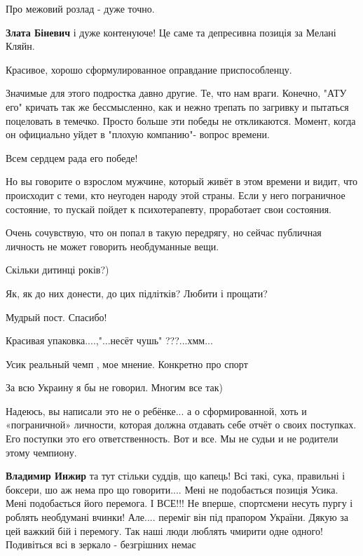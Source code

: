 \begin{itemize}
\begin{itemize}
\end{itemize} %

Про межовий розлад - дуже точно.

\begin{itemize} %
\textbf{Злата Біневич} і дуже контенуюче! Це саме та депресивна позиція за Мелані Кляйн.
\end{itemize} %

Красивое, хорошо сформулированное оправдание приспособленцу.


Значимые для этого подростка давно другие. Те, что нам враги. Конечно, "АТУ
его" кричать так же бессмысленно, как и нежно трепать по загривку и пытаться
поцеловать в темечко. Просто больше эти победы не откликаются. Момент, когда он
официально уйдет в "плохую компанию"- вопрос времени.



Всем сердцем рада его победе!

Но вы говорите о взрослом мужчине, который живёт в этом времени и видит, что
происходит с теми, кто неугоден народу этой страны. Если у него пограничное
состояние, то пускай пойдет к психотерапевту, проработает свои состояния.

Очень сочувствую, что он попал в такую передрягу, но сейчас публичная личность
не может говорить необдуманные вещи.

Скільки дитинці років?)

Як, як до них донести, до цих підлітків? Любити і прощати?

Мудрый пост. Спасибо!

Красивая упаковка....,"...несёт чушь" ???...хмм...

Усик реальный чемп , мое мнение. Конкретно про спорт

За всю Украину я бы не говорил. Многим все так)


Надеюсь, вы написали это не о ребёнке... а о сформированной, хоть и «пограничной»
личности, которая должна отдавать себе отчёт о своих поступках. Его поступки
это его ответственность. Вот и все. Мы не судьи и не родители этому чемпиону.

\begin{itemize} %
\textbf{Владимир Инжир} та тут стільки суддів, що капець! Всі такі, сука, правильні і боксери, шо аж нема про що говорити....
Мені не подобається позиція Усика. Мені подобається його перемога. І ВСЕ!!!
Не вперше, спортсмени несуть пургу і роблять необдумані вчинки!
Але.... переміг він під прапором України. Дякую за цей важкий бій і перемогу.
Так наші люди люблять чмирити одне одного! Подивіться всі в зеркало - безгрішних немає


\end{itemize}
\end{itemize}
